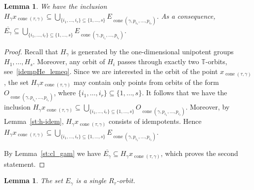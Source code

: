 \documentclass[a4paper, 11pt]{amsart}
\theoremstyle{plain}
\newtheorem{lemma}[theorem]{Lemma}
\theoremstyle{remark}
\theoremstyle{definition}
\newcommand{\TT}{\mathbb{T}}
\newcommand{\ol}[1]{\overline{#1}}
\DeclareMathOperator{\cone}{cone}
\begin{document}
\begin{lemma}\label{st:incl}
We have the inclusion $H_\gamma x_{\cone(\tau, \gamma)} \subseteq \bigcup_{ \{i_1, \ldots, i_r\} \subseteq  \{1, \ldots, s\}} E_{\cone(\gamma, p_{i_1}, \ldots, p_{i_r})}$. As a consequence, $\ol{E_\gamma} \subseteq \bigcup_{ \{i_1, \ldots, i_r\} \subseteq \{1, \ldots, s\}} E_{\cone(\gamma, p_{i_1}, \ldots, p_{i_r})}$.
\end{lemma}

\begin{proof} Recall that $H_\gamma$ is generated by the one-dimensional unipotent groups $H_1, \ldots, H_s$. Moreover, any orbit of $H_i$ passes through exactly two $\TT$-orbits, see~\eqref{idempHe_lemeq}. Since we are interested in the orbit of the point $x_{\cone(\tau, \gamma)}$, the set $H_\gamma x_{\cone(\tau, \gamma)}$ may contain only points from orbits of the form $ O_{\cone(\gamma, p_{i_1}, \ldots, p_{i_r})}$, where $ \{i_1, \ldots, i_r\} \subseteq \{1, \ldots, s\}$. 
It follows that we have the inclusion $H_\gamma x_{\cone(\tau, \gamma)} \subseteq \bigcup_{ \{i_1, \ldots, i_r\} \subseteq \{1, \ldots, s\}} O_{\cone(\gamma, p_{i_1}, \ldots, p_{i_r})}$. Moreover, by Lemma~\ref{st:h-idem}, $H_\gamma x_{\cone(\tau, \gamma)}$ consists of idempotents. Hence $H_\gamma x_{\cone(\tau, \gamma)} \subseteq \bigcup_{\{i_1, \ldots, i_r\} \subseteq \{1, \ldots, s\}} E_{\cone(\gamma, p_{i_1}, \ldots, p_{i_r})}$.
	
By Lemma~\ref{st:cl_gam} we have $\ol{E_\gamma} \subseteq H_\gamma x_{\cone(\tau, \gamma)}$, which proves the second statement.
\end{proof}


\begin{lemma}\label{one_orb}
The set $E_\gamma$ is a single $R_\tau$-orbit.
\end{lemma}
\end{document}
